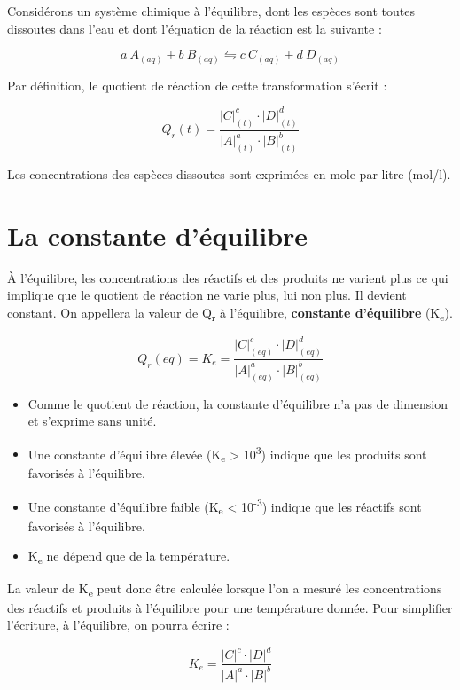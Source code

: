 \documentclass[
  11pt,
  french,
  a4paper,
  openany]{book}
\providecommand{\tightlist}{%
  \setlength{\itemsep}{0pt}\setlength{\parskip}{0pt}}
\begin{document}
Considérons un système chimique à l'équilibre, dont les espèces sont toutes dissoutes dans l'eau et dont l'équation de la réaction est la suivante :

\[
  a\ A_{(aq)} + b\ B_{(aq)} \leftrightharpoons c\ C_{(aq)} + d\ D_{(aq)}
\]

Par définition, le quotient de réaction de cette transformation s'écrit :

\[
  Q_{r}(t) = \frac{|C|_{(t)}^{c} \cdot |D|_{(t)}^{d}}{|A|_{(t)}^{a} \cdot |B|_{(t)}^{b}}
\]

Les concentrations des espèces dissoutes sont exprimées en mole par litre (mol/l).

\hypertarget{la-constante-duxe9quilibre}{%
\section{La constante d'équilibre}\label{la-constante-duxe9quilibre}}

À l'équilibre, les concentrations des réactifs et des produits ne varient plus ce qui implique que le quotient de réaction ne varie plus, lui non plus. Il devient constant. On appellera la valeur de Q\textsubscript{r} à l'équilibre, \textbf{constante d'équilibre} (K\textsubscript{e}).

\[
  Q_{r}(eq) = K_{e} = \frac{|C|_{(eq)}^{c} \cdot |D|_{(eq)}^{d}}{|A|_{(eq)}^{a} \cdot |B|_{(eq)}^{b}}
\]

\begin{itemize}
\tightlist
\item
  Comme le quotient de réaction, la constante d'équilibre n'a pas de dimension et s'exprime sans unité.
\item
  Une constante d'équilibre élevée (K\textsubscript{e} \textgreater{} 10\textsuperscript{3}) indique que les produits sont favorisés à l'équilibre.
\item
  Une constante d'équilibre faible (K\textsubscript{e} \textless{} 10\textsuperscript{-3}) indique que les réactifs sont favorisés à l'équilibre.
\item
  K\textsubscript{e} ne dépend que de la température.
\end{itemize}

La valeur de K\textsubscript{e} peut donc être calculée lorsque l'on a mesuré les concentrations des réactifs et produits à l'équilibre pour une température donnée. Pour simplifier l'écriture, à l'équilibre, on pourra écrire :

\[
  K_{e} = \frac{|C|^{c} \cdot |D|^{d}}{|A|^{a} \cdot |B|^{b}}
\]
\end{document}

